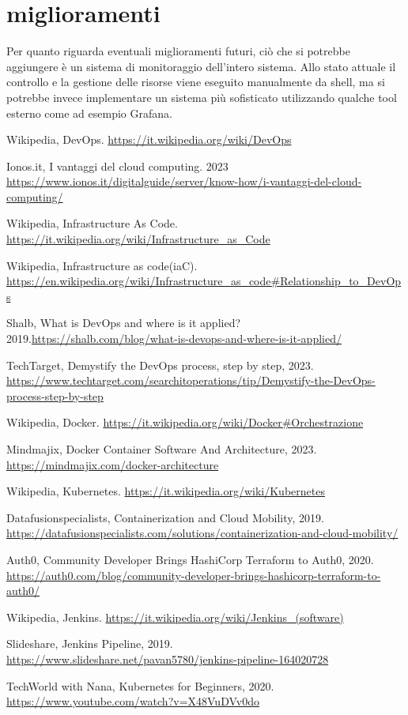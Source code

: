 \documentclass[a4paper,12pt]{report}
\begin{document}
\section{miglioramenti}
Per quanto riguarda eventuali miglioramenti futuri, ciò che si potrebbe aggiungere è un sistema di monitoraggio dell'intero sistema. Allo stato attuale il controllo e la gestione delle risorse viene eseguito manualmente da shell, ma si potrebbe invece implementare un sistema più sofisticato utilizzando qualche tool esterno come ad esempio Grafana.
%
%
\begin{thebibliography}{00}
%

Wikipedia, DevOps. \url{https://it.wikipedia.org/wiki/DevOps}

Ionos.it, I vantaggi del cloud computing. 2023 \url{https://www.ionos.it/digitalguide/server/know-how/i-vantaggi-del-cloud-computing/}


Wikipedia, Infrastructure As Code. \url{https://it.wikipedia.org/wiki/Infrastructure_as_Code}

Wikipedia, Infrastructure as code(iaC). \url{https://en.wikipedia.org/wiki/Infrastructure_as_code#Relationship_to_DevOps}

Shalb, What is DevOps and where is it applied? 2019.\url{https://shalb.com/blog/what-is-devops-and-where-is-it-applied/}


TechTarget, Demystify the DevOps process, step by step, 2023. \url{https://www.techtarget.com/searchitoperations/tip/Demystify-the-DevOps-process-step-by-step}

Wikipedia, Docker. \url{https://it.wikipedia.org/wiki/Docker#Orchestrazione}

Mindmajix, Docker Container Software And Architecture, 2023. \url{https://mindmajix.com/docker-architecture}

Wikipedia, Kubernetes. \url{https://it.wikipedia.org/wiki/Kubernetes}

Datafusionspecialists, Containerization and Cloud Mobility, 2019. \url{https://datafusionspecialists.com/solutions/containerization-and-cloud-mobility/}

Auth0, Community Developer Brings HashiCorp Terraform to Auth0, 2020. \url{https://auth0.com/blog/community-developer-brings-hashicorp-terraform-to-auth0/}

Wikipedia, Jenkins. \url{https://it.wikipedia.org/wiki/Jenkins_(software)}

Slideshare, Jenkins Pipeline, 2019. \url{https://www.slideshare.net/pavan5780/jenkins-pipeline-164020728}

TechWorld with Nana, Kubernetes for Beginners, 2020. \url{https://www.youtube.com/watch?v=X48VuDVv0do}
%
%
\end{thebibliography}
% 
\end{document}
